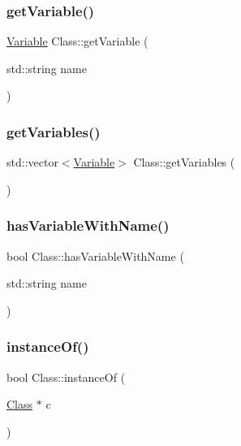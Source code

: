 \mbox{\label{classClass_a5c5de4f3c1419dedc92fc3d982fc6f65}} 
\subsubsection{\texorpdfstring{get\+Variable()}{getVariable()}}
{\footnotesize\ttfamily \hyperlink{classVariable}{Variable} Class\+::get\+Variable (\begin{DoxyParamCaption}\item[{std\+::string}]{name }\end{DoxyParamCaption})}

\mbox{\label{classClass_ab24282751aa8b0ba2b2c71fbd3eef7e5}} 
\subsubsection{\texorpdfstring{get\+Variables()}{getVariables()}}
{\footnotesize\ttfamily std\+::vector$<$\hyperlink{classVariable}{Variable}$>$ Class\+::get\+Variables (\begin{DoxyParamCaption}{ }\end{DoxyParamCaption})}

\mbox{\label{classClass_a0c5ffb0b7e3e95dedad01b8b4e91d93b}} 
\subsubsection{\texorpdfstring{has\+Variable\+With\+Name()}{hasVariableWithName()}}
{\footnotesize\ttfamily bool Class\+::has\+Variable\+With\+Name (\begin{DoxyParamCaption}\item[{std\+::string}]{name }\end{DoxyParamCaption})}

\mbox{\label{classClass_a9bbffa241c269033a12c76f85af9c5ac}} 
\subsubsection{\texorpdfstring{instance\+Of()}{instanceOf()}}
{\footnotesize\ttfamily bool Class\+::instance\+Of (\begin{DoxyParamCaption}\item[{\hyperlink{classClass}{Class} $\ast$}]{c }\end{DoxyParamCaption})}



